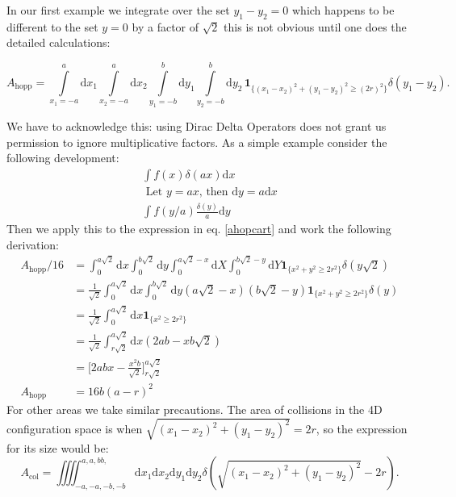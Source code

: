 \documentclass[letterpaper,10pt, jcp, aps]{revtex4-1}
\newcommand{\rd}{\!\mathrm{d}}
\newcommand{\indicator}[1]{\mathbf{1}_{ \{   #1 \} } }
\begin{document}
In our first example
we integrate over the set $y_1-y_2=0$ which happens to be different to the set
$y=0$ by a factor of $\sqrt{2}$ this is not obvious until one does the detailed calculations:
\begin{widetext}\label{ahopcart}
\begin{equation}
 A_\text{hopp} = \int\limits_{x_1 = -a}^a \rd x_1 \int\limits_{x_2 = -a}^a \rd x_2 
\int\limits_{y_1 = -b}^b \rd y_1 \int\limits_{y_2 = -b}^b \rd y_2 \, \indicator{ (x_1-x_2)^2 + (y_1-y_2)^2 \ge (2r)^2 } \delta(y_1-y_2).
\end{equation}
\end{widetext}
We have to acknowledge this: using Dirac Delta Operators does not grant us permission
to ignore multiplicative factors. As a simple example consider the following
development:
  \begin{align*}
    \int f(x) \delta(a x) \rd x \\
    \text{ Let } y=ax \text{, then } \rd y = a \rd x\\
    \int f(y/a) \frac{\delta(y)}{a} \rd y 
  \end{align*}
  Then we apply this to the expression in eq. \ref{ahopcart} and work the following
  derivation:
  \begin{align}
    A_\text{hopp}/16 & = \int_0^{a\sqrt{2}} \rd x  \int_0^{b \sqrt{2}} \rd y
    \int_0^{a\sqrt{2}-x} \rd X  \int_0^{b \sqrt{2}-y} \rd Y
    \indicator{x^2+y^2 \geq 2 r^2} \delta (y\sqrt{2})\\
    &= \frac{1}{\sqrt{2}} \int_0^{a\sqrt{2}} \rd x  \int_0^{b \sqrt{2}} \rd y
    (a\sqrt{2}-x)(b\sqrt{2}-y)
    \indicator{x^2+y^2 \geq 2 r^2} \delta (y)\\
    &=\frac{1}{\sqrt{2}} \int_0^{a\sqrt{2}} \rd x
    \indicator{x^2\geq 2 r^2} \\
    &=\frac{1}{\sqrt{2}} \int_{r\sqrt{2}}^{a\sqrt{2}} \rd x
    (2ab-xb\sqrt{2})\\
    &=\biggl[2abx-\frac{x^2b}{\sqrt{2}} \biggr]_{r\sqrt{2}}^{a\sqrt{2}}\\
      A_\text{hopp}&=16b(a-r)^2
  \end{align}  
  For other areas we take similar precautions. The area of collisions in
  the 4D configuration space is when $\sqrt{(x_1-x_2)^2+(y_1-y_2)^2}=2r$, so the
  expression for its size would be:
  \begin{equation}
    A_\text{col}=\iiiint _{-a,-a,-b,-b}^{a,a,bb,}
    \rd x_1 \rd x_2 \rd y_1 \rd y_2 
    \delta (\sqrt{(x_1-x_2)^2+(y_1-y_2)^2}-2r).
    \end{equation}
\end{document}
